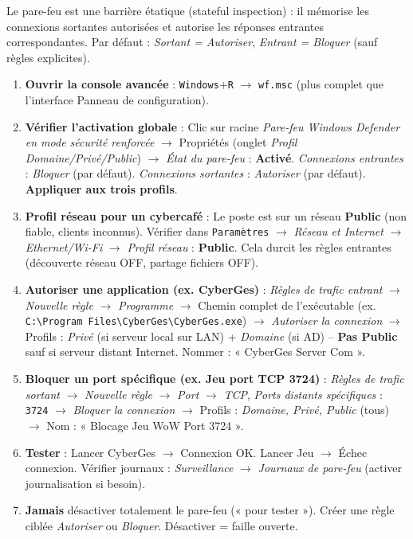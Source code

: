\documentclass[11pt]{article}
\newcommand{\cle}[1]{{\popxbold\color{popdark}#1}}
\begin{document}
\begin{methode}
Le pare-feu est une \cle{barrière étatique} (stateful inspection) : il mémorise les connexions sortantes autorisées et autorise les réponses entrantes correspondantes. Par défaut : \emph{Sortant = Autoriser}, \emph{Entrant = Bloquer} (sauf règles explicites).
\begin{enumerate}
\item \textbf{Ouvrir la console avancée} : \texttt{Windows}+\texttt{R} $\rightarrow$ \texttt{wf.msc} (plus complet que l'interface Panneau de configuration).
\item \textbf{Vérifier l'activation globale} : Clic sur racine \emph{Pare-feu Windows Defender en mode sécurité renforcée} $\rightarrow$ Propriétés (onglet \emph{Profil Domaine/Privé/Public}) $\rightarrow$ \emph{État du pare-feu} : \textbf{Activé}. \emph{Connexions entrantes} : \emph{Bloquer} (par défaut). \emph{Connexions sortantes} : \emph{Autoriser} (par défaut). \textbf{Appliquer aux trois profils}.
\item \textbf{Profil réseau pour un cybercafé} : Le poste est sur un réseau \textbf{Public} (non fiable, clients inconnus). Vérifier dans \texttt{Paramètres} $\rightarrow$ \emph{Réseau et Internet} $\rightarrow$ \emph{Ethernet/Wi-Fi} $\rightarrow$ \emph{Profil réseau} : \textbf{Public}. Cela durcit les règles entrantes (découverte réseau OFF, partage fichiers OFF).
\item \textbf{Autoriser une application (ex. CyberGes)} : \emph{Règles de trafic entrant} $\rightarrow$ \emph{Nouvelle règle} $\rightarrow$ \emph{Programme} $\rightarrow$ Chemin complet de l'exécutable (ex. \texttt{C:\textbackslash Program Files\textbackslash CyberGes\textbackslash CyberGes.exe}) $\rightarrow$ \emph{Autoriser la connexion} $\rightarrow$ Profils : \emph{Privé} (si serveur local sur LAN) + \emph{Domaine} (si AD) -- \textbf{Pas Public} sauf si serveur distant Internet. Nommer : « CyberGes Server Com ».
\item \textbf{Bloquer un port spécifique (ex. Jeu port TCP 3724)} : \emph{Règles de trafic sortant} $\rightarrow$ \emph{Nouvelle règle} $\rightarrow$ \emph{Port} $\rightarrow$ \emph{TCP}, \emph{Ports distants spécifiques} : \texttt{3724} $\rightarrow$ \emph{Bloquer la connexion} $\rightarrow$ Profils : \emph{Domaine, Privé, Public} (tous) $\rightarrow$ Nom : « Blocage Jeu WoW Port 3724 ».
\item \textbf{Tester} : Lancer CyberGes $\rightarrow$ Connexion OK. Lancer Jeu $\rightarrow$ Échec connexion. Vérifier journaux : \emph{Surveillance} $\rightarrow$ \emph{Journaux de pare-feu} (activer journalisation si besoin).
\item \textbf{Jamais} désactiver totalement le pare-feu (« pour tester »). Créer une règle ciblée \emph{Autoriser} ou \emph{Bloquer}. Désactiver = faille ouverte.
\end{enumerate}
\end{methode}
\end{document}
